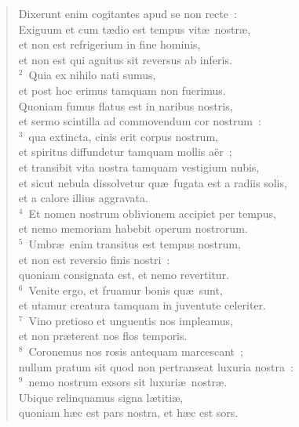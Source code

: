 \begin{flushleft}\begin{verse}\vspace{-19pt}Dixerunt enim cogitantes apud se non recte~:\\ Exiguum et cum t\ae dio est tempus vit\ae\ nostr\ae ,\\ et non est refrigerium in fine hominis,\\ et non est qui agnitus sit reversus ab inferis.\\
${}^{2}$~Quia ex nihilo nati sumus,\\ et post hoc erimus tamquam non fuerimus.\\ Quoniam fumus flatus est in naribus nostris,\\ et sermo scintilla ad commovendum cor nostrum~:\\
${}^{3}$~qua extincta, cinis erit corpus nostrum,\\ et spiritus diffundetur tamquam mollis a\"er~;\\ et transibit vita nostra tamquam vestigium nubis,\\ et sicut nebula dissolvetur qu\ae\ fugata est a radiis solis,\\ et a calore illius aggravata.\\
${}^{4}$~Et nomen nostrum oblivionem accipiet per tempus,\\ et nemo memoriam habebit operum nostrorum.\\
${}^{5}$~Umbr\ae\ enim transitus est tempus nostrum,\\ et non est reversio finis nostri~:\\ quoniam consignata est, et nemo revertitur.\\
${}^{6}$~Venite ergo, et fruamur bonis qu\ae\ sunt,\\ et utamur creatura tamquam in juventute celeriter.\\
${}^{7}$~Vino pretioso et unguentis nos impleamus,\\ et non pr\ae tereat nos flos temporis.\\
${}^{8}$~Coronemus nos rosis antequam marcescant~;\\ nullum pratum sit quod non pertranseat luxuria nostra~:\\
${}^{9}$~nemo nostrum exsors sit luxuri\ae\ nostr\ae .\\ Ubique relinquamus signa l\ae titi\ae ,\\ quoniam h\ae c est pars nostra, et h\ae c est sors.\\

\end{verse}
\end{flushleft}
